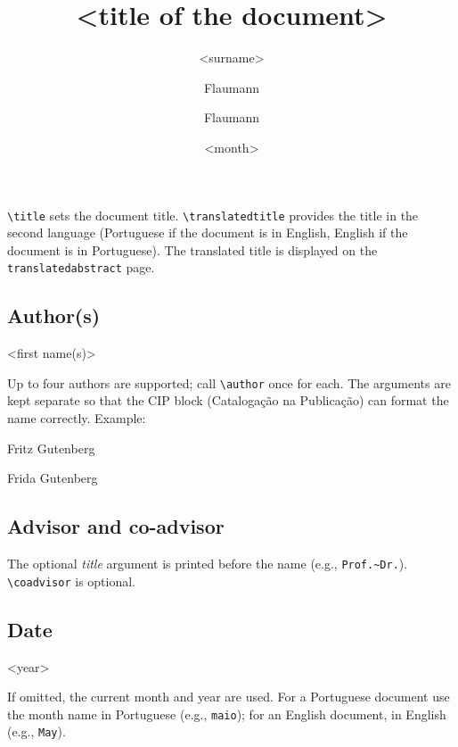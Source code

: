 \documentclass[11pt,a4paper]{article}
\newcommand{\cmd}[1]{\texttt{\textbackslash #1}}
\newcommand{\env}[1]{\texttt{#1}}
\newcommand{\meta}[1]{\textit{\textlangle#1\textrangle}}
\begin{document}
\begin{latex}
\title{<title of the document>}
\end{latex}

\cmd{title} sets the document title.  \cmd{translatedtitle} provides
the title in the second language (Portuguese if the document is in
English, English if the document is in Portuguese).  The translated
title is displayed on the \env{translatedabstract} page.

\subsection{Author(s)}

\begin{latex}
\author{<surname>}{<first name(s)>}
\end{latex}

Up to four authors are supported; call \cmd{author} once for each.
The arguments are kept separate so that the CIP block (Catalogação na
Publicação) can format the name correctly.  Example:

\begin{latex}
\author{Flaumann}{Fritz Gutenberg}
\author{Flaumann}{Frida Gutenberg}
\end{latex}

\subsection{Advisor and co-advisor}

\begin{latex}
\end{latex}

The optional \meta{title} argument is printed before the name
(e.g., \texttt{Prof.\textasciitilde Dr.}).  \cmd{coadvisor} is optional.

\subsection{Date}

\begin{latex}
\date{<month>}{<year>}
\end{latex}

If omitted, the current month and year are used.
For a Portuguese document use the month name in Portuguese
(e.g., \texttt{maio}); for an English document, in English
(e.g., \texttt{May}).
\end{document}
